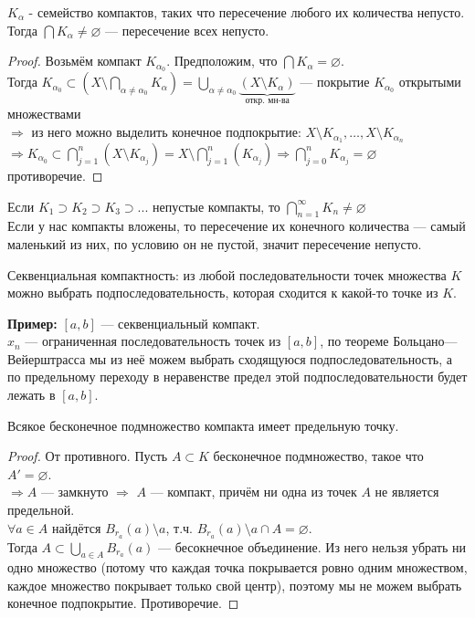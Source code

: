\begin{theorem-non}
    $K_{\alpha}$ - семейство компактов, таких что пересечение любого их количества непусто.
    Тогда $\bigcap K_{\alpha} \neq \varnothing$ --- пересечение всех непусто.
    \begin{proof}
        Возьмём компакт $K_{\alpha_0}$. Предположим, что $\bigcap K_{\alpha} = \varnothing$. \\
        Тогда $K_{\alpha_0} \subset (X \setminus \bigcap\limits_{\alpha \neq \alpha_{0}} K_{\alpha}) = 
        \bigcup\limits_{\alpha \neq \alpha_{0}} \underbrace{(X \setminus K_{\alpha})}_\text{откр. мн-ва}$ --- покрытие $K_{\alpha_{0}}$ открытыми множествами \\
        $\Longrightarrow$ из него можно выделить конечное подпокрытие: $X \setminus K_{\alpha_{1}}, \dots, X \setminus K_{\alpha_{n}}$ \\
        $\Longrightarrow K_{\alpha_0} \subset \bigcap\limits_{j=1}^{n}(X \setminus K_{\alpha_{j}}) = X \setminus \bigcap\limits_{j = 1}^{n}(K_{\alpha_{j}}) \Longrightarrow
        \bigcap\limits_{j=0}^{n} K_{\alpha_{j}} = \varnothing$ противоречие. 
    \end{proof}
\end{theorem-non}
\follow \quad Если $K_1 \supset K_2 \supset K_3 \supset ...$ непустые компакты, то $\bigcap\limits_{n=1}^{\infty} K_n \neq \varnothing$ \\
Если у нас компакты вложены, то пересечение их конечного количества --- самый маленький из них, по условию он не пустой, значит пересечение непусто.

\begin{conj}
Секвенциальная компактность: из любой последовательности точек множества
$K$ можно выбрать подпоследовательность, которая сходится к какой-то точке из $K$.
\end{conj}
\textbf{Пример:} $[a,b]$ --- секвенциальный компакт. \\
$x_n$ --- ограниченная последовательность точек из $[a,b]$, по теореме
Больцано—Вейерштрасса мы из неё можем выбрать сходящуюся подпоследовательность, а
по предельному переходу в неравенстве предел этой подпоследовательности будет лежать в $[a,b]$.

\begin{theorem-non}
Всякое бесконечное подмножество компакта имеет предельную точку.
\begin{proof}
    От противного. Пусть $A \subset K$ бесконечное подмножество, такое что $A' = \varnothing$. \\
    $\Longrightarrow A$ --- замкнуто $\Longrightarrow$ $A$ --- компакт, причём ни одна из точек $A$ не является предельной. \\
    $\forall a \in A$ найдётся $B_{r_a}(a) \setminus a$, т.ч. $B_{r_a}(a) \setminus a \cap A = \varnothing$. \\
    Тогда $A \subset \bigcup\limits_{a\in A} B_{r_a}(a)$ --- бесокнечное объединение.
    Из него нельзя убрать ни одно множество (потому что каждая точка покрывается ровно одним множеством, каждое множество покрывает только свой центр), поэтому мы не можем выбрать конечное подпокрытие. Противоречие.
\end{proof}
\end{theorem-non}

